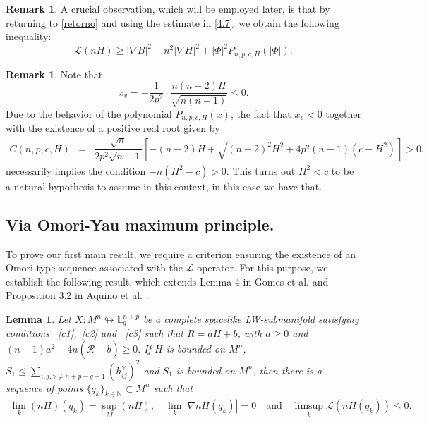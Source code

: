 \documentclass[leqno,11pt]{amsart}
\theoremstyle{plain}
\newtheorem{lemma}[theorem]{\indent\sc Lemma}
\theoremstyle{definition}
\newtheorem{remark}[theorem]{\indent\sc Remark}
\numberwithin{equation}{section}
\begin{document}
\begin{remark}

A crucial observation, which will be employed later, is that by returning to \eqref{retorno} and using the estimate in \eqref{4.7}, we obtain the following inequality:
\begin{equation}\label{estimativa_chave}
\mathcal{L}(nH) \geq |\nabla B|^2 - n^2 |\nabla H|^2 + |\Phi|^2  P_{n,p,c,H}(|\Phi|).
\end{equation}

\end{remark}

\begin{remark}
 \noindent
Note that 
$$
x_v=-\dfrac{1}{2p^2}\cdot \dfrac{n(n-2)H}{\sqrt{n(n-1)}}\leq 0.
$$
Due to the behavior of the polynomial \(P_{n,p,c,H}(x)\), the fact that \(x_v < 0\) together with the existence of a positive real root given by 
\begin{eqnarray*}
C(n,p,c,H)
&=&\dfrac{\sqrt{n}}{2p^2\sqrt{n-1}}\left[-(n-2)H+\sqrt{(n-2)^2H^2+4p^2(n-1)(c-H^2)}\right]>0,
\end{eqnarray*}
necessarily implies the condition \(-n(H^2-c)>0\). This turns out \(H^2 < c\) to be a natural hypothesis to assume in this context, in this case we have that.
   
\end{remark}


\subsection{Via Omori-Yau maximum principle.}

To prove our first main result, we require a criterion ensuring the existence of an Omori-type sequence associated with the $\mathcal{L}$-operator. For this purpose, we establish the following result, which extends Lemma 4 in Gomes et al. \cite{nazareno} and Proposition 3.2 in Aquino et al. \cite{aquino}.

\begin{lemma}  Let $X:M^n\looparrowright \mathbb{L}^{n+p}_{q}$ be a complete spacelike LW-submanifold satisfying conditions ~\eqref{c1},~\eqref{c2} and ~\eqref{c3} such that $R=aH+b$, with $a\geq 0$ and $(n-1)a^2+4n(\overline{\mathcal{R}}-b)\geq 0.$ If $H$ is bounded on $M^n$, $S_1\leq \sum_{i,j,\gamma\neq n+p-q+1}(h_{ij}^{\gamma})^2$ and $S_1$ is bounded on $M^n$, then there is a sequence of points $\{q_k\}_{k\in \mathbb{N}}\subset M^n$ such that 
\begin{eqnarray*}
\lim_{k}(nH)(q_k)=\sup_{M}(nH),\quad \lim_{k}|\nabla nH(q_k)|=0\quad\mbox{and}\quad \limsup_{k}\mathcal{L}(nH(q_k))\leq 0.
\end{eqnarray*}
\end{lemma}
\end{document}
